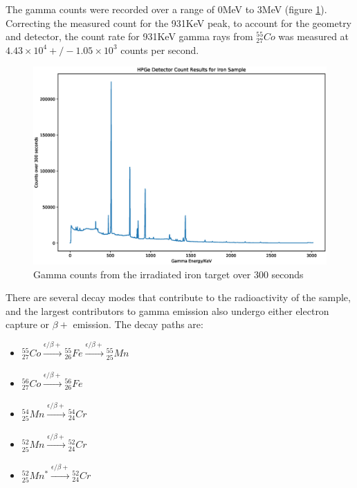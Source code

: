 The gamma counts were recorded over a range of 0MeV to 3MeV (figure \ref{fig:measuredgammacounts}). Correcting the measured count for the 931KeV peak, to account for the geometry and detector, the count rate for 931KeV gamma rays from ${}^{55}_{27} Co$ was measured at $4.43\times10^4 +/- 1.05 \times 10^3$ counts per second.

\begin{figure}[ht] 
  \centering
  \begin{minipage}[b]{0.85\linewidth}
    \centering
    \includegraphics[width=.9\linewidth]{chapters/activity_code/experimental/gamma_counts.eps} 
    \caption{Gamma counts from the irradiated iron target over 300 seconds}  
    \label{fig:measuredgammacounts}
  \end{minipage}%
\end{figure}

There are several decay modes that contribute to the radioactivity of the sample, and the largest contributors to gamma emission also undergo either electron capture or $\beta +$ emission.  The decay paths are:

\begin{itemize}
\item ${}^{55}_{27}Co \xrightarrow[]{\epsilon/\beta +} {}^{55}_{26}Fe \xrightarrow[]{\epsilon/\beta +} {}^{55}_{25}Mn$
\item ${}^{56}_{27}Co \xrightarrow[]{\epsilon/\beta +} {}^{56}_{26}Fe$
\item ${}^{54}_{25}Mn \xrightarrow[]{\epsilon/\beta +} {}^{54}_{24}Cr$
\item ${}^{52}_{25}Mn \xrightarrow[]{\epsilon/\beta +} {}^{52}_{24}Cr$ 
\item ${}^{52}_{25}Mn^{*} \xrightarrow[]{\epsilon/\beta +} {}^{52}_{24}Cr$
\end{itemize}

